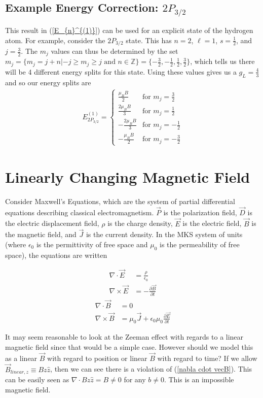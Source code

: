 \documentclass[11pt]{article}
\begin{document}
\subsection{Example Energy Correction: $2P_{3/2}$}
This result in (\ref{E_{n}^{(1)}}) can be used for an explicit state of the hydrogen atom. For example, consider the $2P_{3/2}$ state. This has $n=2$, $\ell =1$, $s=\frac{1}{2}$, and $j=\frac{3}{2}$. The $m_j$ values can thus be determined by the set $m_j = \{m_j=j+n|-j \geq m_j \geq j \textrm{ and } n \in \mathbb{Z}\} = \{-\frac{3}{2},-\frac{1}{2}, \frac{1}{2}, \frac{3}{2} \}$, which tells us there will be 4 different energy splits for this state. Using these values gives us a $g_L=\frac{4}{3}$ and so our energy splits are
\begin{align}
E_{2P_{3/2}}^{(1)} = \begin{cases}
\frac{\mu_BB}{2} & \textrm{for }m_j = \frac{3}{2}\\ 
\frac{2\mu_BB}{3} & \textrm{for }m_j = \frac{1}{2} \\
-\frac{2\mu_BB}{3}& \textrm{for }m_j = -\frac{1}{2} \\
-\frac{\mu_BB}{2} & \textrm{for }m_j = -\frac{3}{2}
\end{cases}  
\end{align}

\section{Linearly Changing Magnetic Field}

Consider Maxwell's Equations, which are the system of partial differential equations describing classical electromagnetism. $\vec{P}$ is the polarization field, $\vec{D}$ is the electric displacement field, $\rho$ is the charge density, $\vec{E}$ is the electric field, $\vec{B}$ is the magnetic field, and $\vec{J}$ is the current density. In the MKS system of units (where $\epsilon_0$ is the permittivity of free space and $\mu_0$ is the permeability of free space), the equations are written 
\begin{multicols}{2}
	\noindent
	\begin{align}
	\nabla \cdot \vec{E} &= \frac{\rho}{\epsilon_0} \label{nabla cdot E}\\
	\nabla \times \vec{E} &= -\frac{\partial \vec{B}}{\partial t} \label{nabla times E}
	\end{align}
	\begin{align}
	\nabla \cdot \vec{B} &= 0  \label{nabla cdot vecB}\\
	\nabla \times \vec{B} &= \mu_0\vec{J}+\epsilon_0\mu_0\frac{\partial \vec{E}}{\partial t} \label{nabla times vecB}
	\end{align}
\end{multicols}
It may seem reasonable to look at the Zeeman effect with regards to a linear magnetic field since that would be a simple case. However should we model this as a linear $\vec{B}$ with regard to position or linear $\vec{B}$ with regard to time? If we allow $\vec{B}_{linear, z} \equiv B z \hat{z}$, then we can see there is a violation of (\ref{nabla cdot vecB}). This can be easily seen as $\nabla \cdot B z \hat{z} = B \neq 0$ for any $b\neq 0$. This is an impossible magnetic field. 
\end{document}
